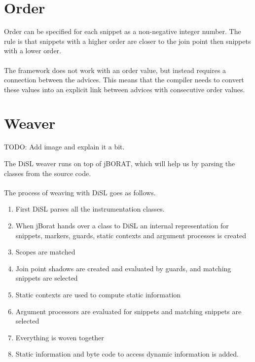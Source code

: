 \documentclass[a4paper]{report}
\begin{document}
\section{Order}
Order can be specified for each snippet as a non-negative integer number. The rule is that snippets with a higher order are closer to the join point then snippets with a lower order.\\
\\
The framework does not work with an order value, but instead requires a connection between the advices. This means that the compiler needs to convert these values into an explicit link between advices with consecutive order values.

\section{Weaver}
TODO: Add image and explain it a bit.

The DiSL weaver runs on top of jBORAT, which will help us by parsing the classes from the source code.\\
\\
The process of weaving with DiSL goes as follows.
\begin{enumerate}
\item First DiSL parses all the instrumentation classes.
\item When jBorat hands over a class to DiSL an internal representation for snippets, markers, guards, static contexts and argument processes is created
\item Scopes are matched
\item Join point shadows are created and evaluated by guards, and matching snippets are selected
\item Static contexts are used to compute static information
\item Argument processors are evaluated for snippets and matching snippets are selected
\item Everything is woven together
\item Static information and byte code to access dynamic information is added.
\end{enumerate}
\end{document}

